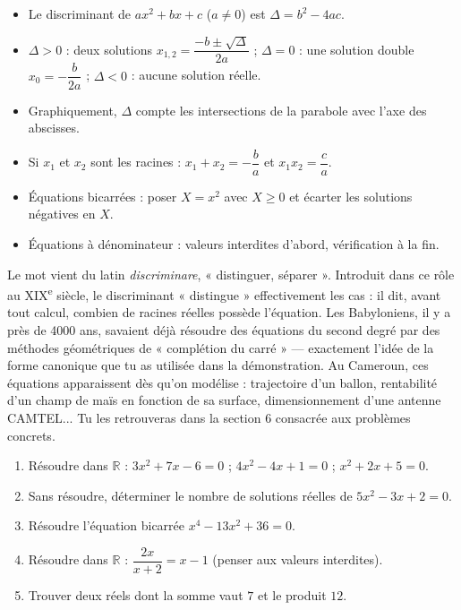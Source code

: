 \documentclass[11pt]{article}
\begin{document}
\begin{aretenir}
\begin{itemize}
\item Le discriminant de $ax^2+bx+c$ ($a\neq 0$) est $\Delta=b^2-4ac$.
\item $\Delta>0$ : deux solutions $x_{1,2}=\dfrac{-b\pm\sqrt{\Delta}}{2a}$ ; $\Delta=0$ : une solution double $x_0=-\dfrac{b}{2a}$ ; $\Delta<0$ : aucune solution réelle.
\item Graphiquement, $\Delta$ compte les intersections de la parabole avec l'axe des abscisses.
\item Si $x_1$ et $x_2$ sont les racines : $x_1+x_2=-\dfrac{b}{a}$ et $x_1x_2=\dfrac{c}{a}$.
\item Équations bicarrées : poser $X=x^2$ avec $X\geq 0$ et écarter les solutions négatives en $X$.
\item Équations à dénominateur : valeurs interdites d'abord, vérification à la fin.
\end{itemize}
\end{aretenir}

\begin{savaistu}
Le mot vient du latin \emph{discriminare}, « distinguer, séparer ». Introduit dans ce rôle au XIX\textsuperscript{e} siècle, le discriminant « distingue » effectivement les cas : il dit, avant tout calcul, combien de racines réelles possède l'équation. Les Babyloniens, il y a près de 4000 ans, savaient déjà résoudre des équations du second degré par des méthodes géométriques de « complétion du carré » — exactement l'idée de la forme canonique que tu as utilisée dans la démonstration. Au Cameroun, ces équations apparaissent dès qu'on modélise : trajectoire d'un ballon, rentabilité d'un champ de maïs en fonction de sa surface, dimensionnement d'une antenne CAMTEL... Tu les retrouveras dans la section 6 consacrée aux problèmes concrets.
\end{savaistu}

\begin{exercice}
\begin{enumerate}
\item Résoudre dans $\mathbb{R}$ : $3x^2+7x-6=0$ ; $4x^2-4x+1=0$ ; $x^2+2x+5=0$.
\item Sans résoudre, déterminer le nombre de solutions réelles de $5x^2-3x+2=0$.
\item Résoudre l'équation bicarrée $x^4-13x^2+36=0$.
\item Résoudre dans $\mathbb{R}$ : $\dfrac{2x}{x+2}=x-1$ (penser aux valeurs interdites).
\item Trouver deux réels dont la somme vaut $7$ et le produit $12$.
\end{enumerate}
\end{exercice}
\end{document}
